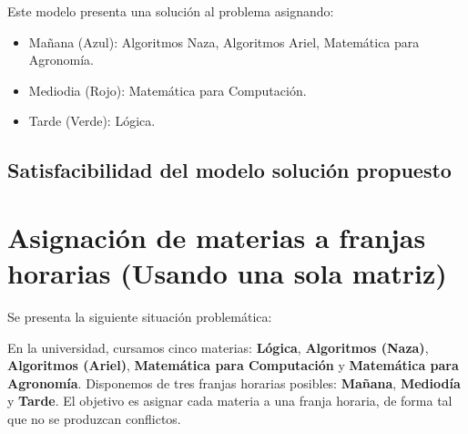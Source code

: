 \documentclass[a4paper,11pt]{article}
\begin{document}
\begin{center}
\end{center}

Este modelo presenta una solución al problema asignando:
\begin{itemize}
    \item Mañana (Azul): Algoritmos Naza, Algoritmos Ariel, Matemática para Agronomía.
    \item Mediodia (Rojo): Matemática para Computación.
    \item Tarde (Verde): Lógica.
\end{itemize}

\subsection{Satisfacibilidad del modelo solución propuesto}














\newpage

\section{Asignación de materias a franjas horarias (Usando una sola matriz)}

Se presenta la siguiente situación problemática:

En la universidad, cursamos cinco materias: \textbf{Lógica}, \textbf{Algoritmos (Naza)}, \textbf{Algoritmos (Ariel)}, \textbf{Matemática para Computación} y \textbf{Matemática para Agronomía}. Disponemos de tres franjas horarias posibles: \textbf{Mañana}, \textbf{Mediodía} y \textbf{Tarde}. El objetivo es asignar cada materia a una franja horaria, de forma tal que no se produzcan conflictos.
\end{document}
